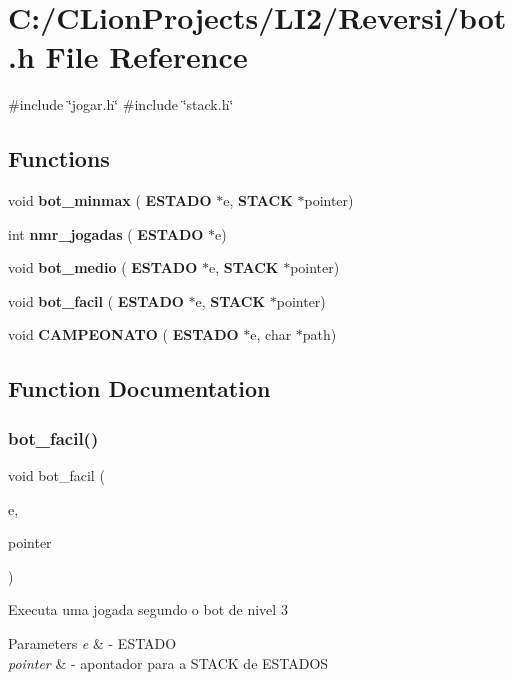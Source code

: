 \section{C\+:/\+C\+Lion\+Projects/\+L\+I2/\+Reversi/bot.h File Reference}
\label{bot_8h}
{\ttfamily \#include \char`\"{}jogar.\+h\char`\"{}}\newline
{\ttfamily \#include \char`\"{}stack.\+h\char`\"{}}\newline
\subsection*{Functions}
\begin{DoxyCompactItemize}
\item 
void \textbf{ bot\+\_\+minmax} (\textbf{ E\+S\+T\+A\+DO} $\ast$e, \textbf{ S\+T\+A\+CK} $\ast$pointer)
\item 
int \textbf{ nmr\+\_\+jogadas} (\textbf{ E\+S\+T\+A\+DO} $\ast$e)
\item 
void \textbf{ bot\+\_\+medio} (\textbf{ E\+S\+T\+A\+DO} $\ast$e, \textbf{ S\+T\+A\+CK} $\ast$pointer)
\item 
void \textbf{ bot\+\_\+facil} (\textbf{ E\+S\+T\+A\+DO} $\ast$e, \textbf{ S\+T\+A\+CK} $\ast$pointer)
\item 
void \textbf{ C\+A\+M\+P\+E\+O\+N\+A\+TO} (\textbf{ E\+S\+T\+A\+DO} $\ast$e, char $\ast$path)
\end{DoxyCompactItemize}


\subsection{Function Documentation}
\mbox{\label{bot_8h_afedf7458980673bb5615796fa24897a9}} 
\subsubsection{bot\_facil()}
{\footnotesize\ttfamily void bot\+\_\+facil (\begin{DoxyParamCaption}\item[{\textbf{ E\+S\+T\+A\+DO} $\ast$}]{e,  }\item[{\textbf{ S\+T\+A\+CK} $\ast$}]{pointer }\end{DoxyParamCaption})}

Executa uma jogada segundo o bot de nivel 3 
\begin{DoxyParams}{Parameters}
{\em e} & -\/ E\+S\+T\+A\+DO \\
\hline
{\em pointer} & -\/ apontador para a S\+T\+A\+CK de E\+S\+T\+A\+D\+OS \\
\hline
\end{DoxyParams}
\mbox{\label{bot_8h_a47a29c238804c4475bbef95ae8ab9031}} 
